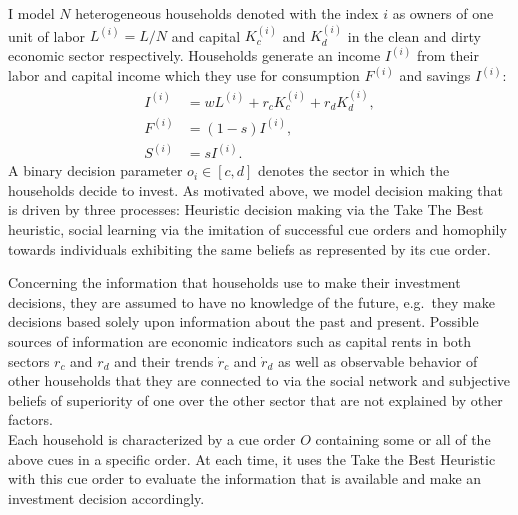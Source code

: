 I model $N$ heterogeneous households denoted with the index $i$ as owners of one unit of labor $L^{(i)} = L/N$ and capital $K_c^{(i)}$ and $K_d^{(i)}$ in the clean and dirty economic sector respectively.
Households generate an income $I^{(i)}$ from their labor and capital income which they use for consumption $F^{(i)}$ and savings $I^{(i)}$:
\begin{align}
	I^{(i)} &= w L^{(i)} + r_c K_c^{(i)} + r_d K_d^{(i)}, \label{eq:household_income} \\
	F^{(i)} &= (1-s) I^{(i)}, \label{eq:consumption} \\
	S^{(i)} &= s I^{(i)}. \label{eq:savings}
\end{align}
A binary decision parameter $o_i \in [c,d]$ denotes the sector in which the households decide to invest. As motivated above, we model decision making that is driven by three processes: Heuristic decision making via the Take The Best heuristic, social learning via the imitation of successful cue orders and homophily towards individuals exhibiting the same beliefs as represented by its cue order. \par

Concerning the information that households use to make their investment decisions, they are assumed to have no knowledge of the future, e.g.\ they make decisions based solely upon information about the past and present. Possible sources of information are economic indicators such as capital rents in both sectors $r_c$ and $r_d$ and their trends $\dot{r}_c$ and $\dot{r}_d$ as well as observable behavior of other households that they are connected to via the social network and subjective beliefs of superiority of one over the other sector that are not explained by other factors.\\
Each household is characterized by a cue order $O$ containing some or all of the above cues in a specific order. At each time, it uses the Take the Best Heuristic with this cue order to evaluate the information that is available and make an investment decision accordingly.
\par

